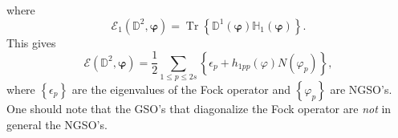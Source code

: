 \documentclass[aps,preprint]{revtex4}%
\begin{document}
where
\begin{equation}
\mathcal{E}_{1}\left(  \mathbb{D}^{2},\mathbf{\varphi}\right)
=\operatorname{Tr}\left\{  \mathbb{D}^{1}\left(  \mathbf{\varphi}\right)
\mathbb{H}_{1}\left(  \mathbf{\varphi}\right)  \right\}  .
\end{equation}
This gives
\begin{equation}
\mathcal{E}\left(  \mathbb{D}^{2},\mathbf{\varphi}\right)  =\frac{1}{2}%
\sum_{1\leq p\leq2s}\left\{  \epsilon_{p}+h_{1pp}\left(  \varphi\right)
N\left(  \varphi_{p}\right)  \right\}  ,
\end{equation}
where $\left\{  \epsilon_{p}\right\}  $ are the eigenvalues of the Fock
operator and $\left\{  \varphi_{p}\right\}  $ are NGSO's. One should note that
the GSO's that diagonalize the Fock operator are \emph{not }in general the NGSO's.
\end{document}
